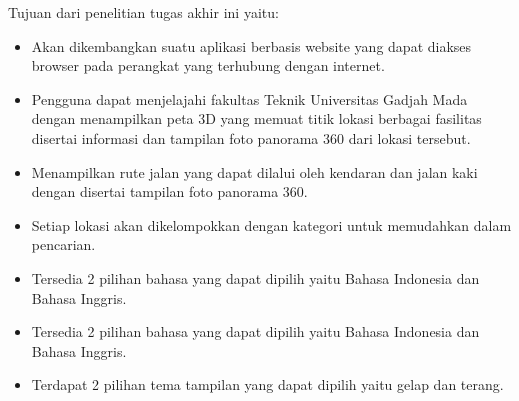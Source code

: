 Tujuan dari penelitian tugas akhir ini yaitu:

\begin{itemize}
	\item Akan dikembangkan suatu aplikasi berbasis website yang dapat diakses browser pada perangkat yang terhubung dengan internet. 
	\item Pengguna dapat menjelajahi fakultas Teknik Universitas Gadjah Mada 
	dengan menampilkan peta 3D yang memuat titik lokasi berbagai fasilitas 
	disertai informasi dan tampilan foto panorama 360 dari lokasi tersebut.
	\item Menampilkan rute jalan yang dapat dilalui oleh kendaran dan jalan kaki dengan disertai tampilan foto panorama 360. 
	\item Setiap lokasi akan dikelompokkan dengan kategori untuk memudahkan dalam pencarian.
	\item Tersedia 2 pilihan bahasa yang dapat dipilih yaitu Bahasa Indonesia dan Bahasa Inggris.
	\item Tersedia 2 pilihan bahasa yang dapat dipilih yaitu Bahasa Indonesia dan Bahasa Inggris.
	\item Terdapat 2 pilihan tema tampilan yang dapat dipilih yaitu gelap dan terang.
\end{itemize}




